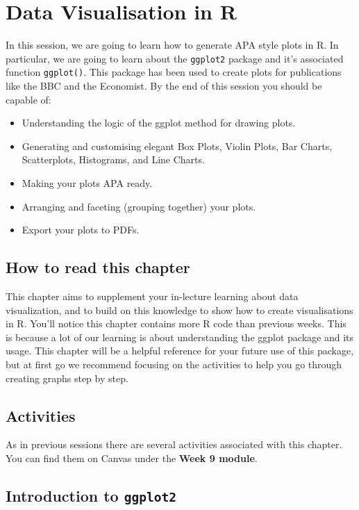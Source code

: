 \documentclass[
]{book}
\providecommand{\tightlist}{%
  \setlength{\itemsep}{0pt}\setlength{\parskip}{0pt}}
\begin{document}
\chapter{Data Visualisation in R}\label{data-vis}

In this session, we are going to learn how to generate APA style plots in R. In particular, we are going to learn about the \texttt{ggplot2} package and it's associated function \texttt{ggplot()}. This package has been used to create plots for publications like the BBC and the Economist. By the end of this session you should be capable of:

\begin{itemize}
\tightlist
\item
  Understanding the logic of the ggplot method for drawing plots.
\item
  Generating and customising elegant Box Plots, Violin Plots, Bar Charts, Scatterplots, Histograms, and Line Charts.
\item
  Making your plots APA ready.
\item
  Arranging and faceting (grouping together) your plots.
\item
  Export your plots to PDFs.
\end{itemize}

\section{How to read this chapter}\label{how-to-read-this-chapter-5}

This chapter aims to supplement your in-lecture learning about data visualization, and to build on this knowledge to show how to create visualisations in R. You'll notice this chapter contains more R code than previous weeks. This is because a lot of our learning is about understanding the ggplot package and its usage. This chapter will be a helpful reference for your future use of this package, but at first go we recommend focusing on the activities to help you go through creating graphs step by step.

\section{Activities}\label{activities-5}

As in previous sessions there are several activities associated with this chapter. You can find them on Canvas under the \textbf{Week 9 module}.

\section{\texorpdfstring{Introduction to \texttt{ggplot2}}{Introduction to ggplot2}}\label{introduction-to-ggplot2}
\end{document}
